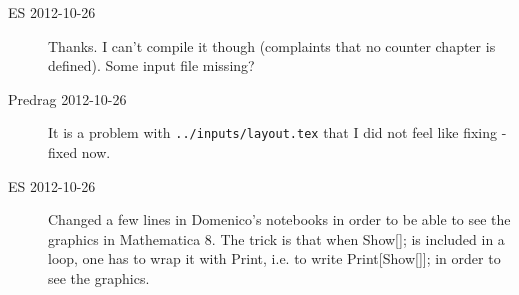 \begin{description}
\item[ES 2012-10-26] Thanks. I can't compile it though (complaints that
no counter chapter is defined). Some input file missing?

\item[Predrag 2012-10-26] It is a problem with
\texttt{../inputs/layout.tex} that I did not feel like fixing - fixed now.

\item[ES 2012-10-26] Changed a few lines in Domenico's notebooks in order
to be able to see the graphics in Mathematica 8. The trick is that when
Show[]; is included in a loop, one has to wrap it with Print, i.e. to
write Print[Show[]]; in order to see the graphics.




\end{description}
